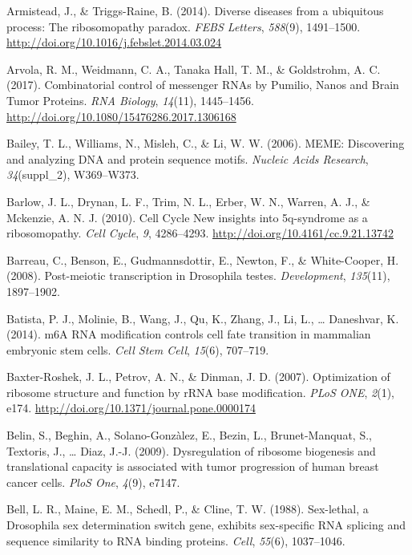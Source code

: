 \documentclass[12pt,oneside]{reedthesis}
\newlength{\cslhangindent}
\newenvironment{cslreferences}%
  {\setlength{\parindent}{0pt}%
  \everypar{\setlength{\hangindent}{\cslhangindent}}\ignorespaces}%
  {\par}
\begin{document}
\begin{cslreferences}
\leavevmode\hypertarget{ref-Armistead2014a}{}%
Armistead, J., \& Triggs-Raine, B. (2014). Diverse diseases from a ubiquitous process: The ribosomopathy paradox. \emph{FEBS Letters}, \emph{588}(9), 1491--1500. \url{http://doi.org/10.1016/j.febslet.2014.03.024}

\leavevmode\hypertarget{ref-Arvola2017n}{}%
Arvola, R. M., Weidmann, C. A., Tanaka Hall, T. M., \& Goldstrohm, A. C. (2017). Combinatorial control of messenger RNAs by Pumilio, Nanos and Brain Tumor Proteins. \emph{RNA Biology}, \emph{14}(11), 1445--1456. \url{http://doi.org/10.1080/15476286.2017.1306168}

\leavevmode\hypertarget{ref-Bailey2006a}{}%
Bailey, T. L., Williams, N., Misleh, C., \& Li, W. W. (2006). MEME: Discovering and analyzing DNA and protein sequence motifs. \emph{Nucleic Acids Research}, \emph{34}(suppl\_2), W369--W373.

\leavevmode\hypertarget{ref-Barlow2010a}{}%
Barlow, J. L., Drynan, L. F., Trim, N. L., Erber, W. N., Warren, A. J., \& Mckenzie, A. N. J. (2010). Cell Cycle New insights into 5q-syndrome as a ribosomopathy. \emph{Cell Cycle}, \emph{9}, 4286--4293. \url{http://doi.org/10.4161/cc.9.21.13742}

\leavevmode\hypertarget{ref-Barreau2008d}{}%
Barreau, C., Benson, E., Gudmannsdottir, E., Newton, F., \& White-Cooper, H. (2008). Post-meiotic transcription in Drosophila testes. \emph{Development}, \emph{135}(11), 1897--1902.

\leavevmode\hypertarget{ref-Batista2014}{}%
Batista, P. J., Molinie, B., Wang, J., Qu, K., Zhang, J., Li, L., \ldots{} Daneshvar, K. (2014). m6A RNA modification controls cell fate transition in mammalian embryonic stem cells. \emph{Cell Stem Cell}, \emph{15}(6), 707--719.

\leavevmode\hypertarget{ref-Baxter-Roshek2007f}{}%
Baxter-Roshek, J. L., Petrov, A. N., \& Dinman, J. D. (2007). Optimization of ribosome structure and function by rRNA base modification. \emph{PLoS ONE}, \emph{2}(1), e174. \url{http://doi.org/10.1371/journal.pone.0000174}

\leavevmode\hypertarget{ref-Belin2009a}{}%
Belin, S., Beghin, A., Solano-Gonzàlez, E., Bezin, L., Brunet-Manquat, S., Textoris, J., \ldots{} Diaz, J.-J. (2009). Dysregulation of ribosome biogenesis and translational capacity is associated with tumor progression of human breast cancer cells. \emph{PloS One}, \emph{4}(9), e7147.

\leavevmode\hypertarget{ref-Bell1988}{}%
Bell, L. R., Maine, E. M., Schedl, P., \& Cline, T. W. (1988). Sex-lethal, a Drosophila sex determination switch gene, exhibits sex-specific RNA splicing and sequence similarity to RNA binding proteins. \emph{Cell}, \emph{55}(6), 1037--1046.


\end{cslreferences}
\end{document}
